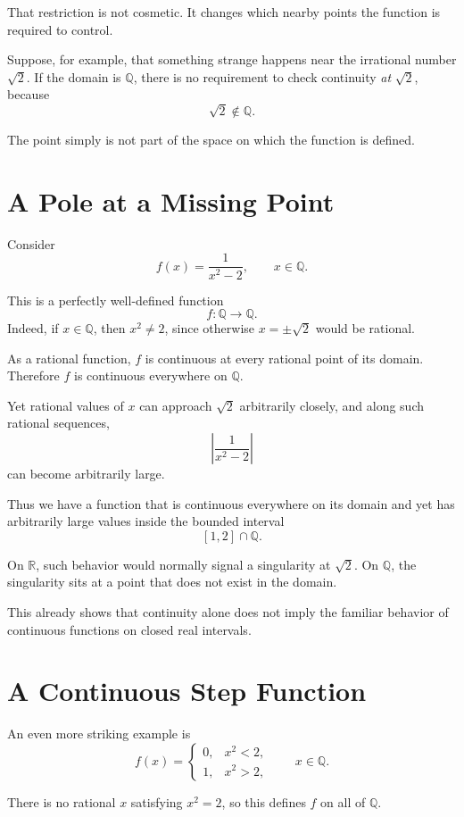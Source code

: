 \documentclass{essay}
\begin{document}
That restriction is not cosmetic. It changes which nearby points the function
is required to control.

Suppose, for example, that something strange happens near the irrational
number \(\sqrt{2}\). If the domain is \(\mathbb{Q}\), there is no requirement
to check continuity \emph{at} \(\sqrt{2}\), because
\[
\sqrt{2}\notin\mathbb{Q}.
\]

The point simply is not part of the space on which the function is defined.

\section{A Pole at a Missing Point}

Consider
\[
f(x)=\frac{1}{x^2-2},
\qquad x\in\mathbb{Q}.
\]

This is a perfectly well-defined function
\[
f:\mathbb{Q}\to\mathbb{Q}.
\]
Indeed, if \(x\in\mathbb{Q}\), then \(x^2\neq 2\), since otherwise
\(x=\pm\sqrt{2}\) would be rational.

As a rational function, \(f\) is continuous at every rational point of its
domain. Therefore \(f\) is continuous everywhere on \(\mathbb{Q}\).

Yet rational values of \(x\) can approach \(\sqrt{2}\) arbitrarily closely,
and along such rational sequences,
\[
\left|\frac{1}{x^2-2}\right|
\]
can become arbitrarily large.

Thus we have a function that is continuous everywhere on its domain and yet
has arbitrarily large values inside the bounded interval
\[
[1,2]\cap\mathbb{Q}.
\]

On \(\mathbb{R}\), such behavior would normally signal a singularity at
\(\sqrt{2}\). On \(\mathbb{Q}\), the singularity sits at a point that does not
exist in the domain.

This already shows that continuity alone does not imply the familiar behavior
of continuous functions on closed real intervals.

\section{A Continuous Step Function}

An even more striking example is
\[
f(x)=
\begin{cases}
0, & x^2<2,\\
1, & x^2>2,
\end{cases}
\qquad x\in\mathbb{Q}.
\]

There is no rational \(x\) satisfying \(x^2=2\), so this defines \(f\) on all
of \(\mathbb{Q}\).
\end{document}

